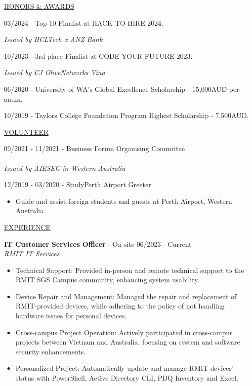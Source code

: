 \documentclass[11pt]{article}
\newcommand{\betteruline}[1]{
    \uline{#1}
}
\newcommand{\sectiontitle}[1]{
    \begingroup
        \titlebold
        \betteruline{\Large\uppercase{#1}  }
        \vspace{1.7mm}
    \endgroup
}
\newcommand{\sectioncontent}[1]{
    \begingroup
        \begin{FlushLeft}
        \vspace{-3mm}
        \sffamily\small#1
        \end{FlushLeft}
    \endgroup
    \vspace{2mm}
}
\newcommand{\job}[3]{
    \begingroup
        \textbf{\small#1} - \small#2
        \hfill\color{black!70}\small{#3}
    \endgroup
}
\newcommand{\spacevv}{
    \vspace{2mm}
}
\newcommand{\honor}[2]{
    \textcolor{black!70}{#1} - #2 \\
    \vspace{1.5mm}
}
\begin{document}
\begin{paracol}{2}
    \sectiontitle{Honors \& Awards}
    \sectioncontent{
        \honor{03/2024}{ 
        Top 10 Finalist at HACK TO HIRE 2024.}
        \textcolor{black!70}{\textit{Issued by HCLTech x ANZ Bank}} \\
        \spacevv
        \vspace{2mm}
        \honor{10/2023}{ 
        3rd place Finalist at CODE YOUR FUTURE 2023.}
        \textcolor{black!70}{\textit{Issued by CJ OliveNetworks Vina}} \\
        \spacevv
        \vspace{2mm}
        \honor{06/2020}{ University of WA's Global Excellence Scholarship - 15,000AUD per anum.}
        \vspace{2mm}
        \honor{10/2019}{Taylors College Foundation Program Highest Scholarship - 7,500AUD.}
    }

    \sectiontitle{Volunteer}
    \sectioncontent{
    \honor{09/2021 - 11/2021}{Business Forum Organising Committee } \\
    \textcolor{black!70}{\textit{Issued by AIESEC in Western Australia}} \\
    \spacevv
    \honor{12/2019 - 03/2020}{StudyPerth Airport Greeter}
    \begin{itemize}
        \item Guide and assist foreign students and guests at Perth Airport, Western Australia
    \end{itemize}
    }

    \switchcolumn

    \sectiontitle{Experience}
    \sectioncontent{
    \job{IT Customer Services Officer}{On-site}{06/2023 - Current} \\
      \textcolor{black!70}{\textit{RMIT IT Services}}
\vspace{1mm}
      \begin{itemize}
        \item Technical Support: Provided in-person and remote technical support to the RMIT SGS Campus community, enhancing system usability.
\vspace{1mm}
        \item Device Repair and Management: Managed the repair and replacement of RMIT-provided devices, while adhering to the policy of not handling hardware issues for personal devices.
\vspace{1mm}
        \item Cross-campus Project Operation: Actively participated in cross-campus projects between Vietnam and Australia, focusing on system and software security enhancements.
        \item Personalized Project: Automatically update and manage RMIT devices' status with PowerShell, Active Directory CLI, PDQ Inventory and Excel.
      \end{itemize}
      \spacevv
\vspace{2mm}
    }


\end{paracol}
\end{document}
